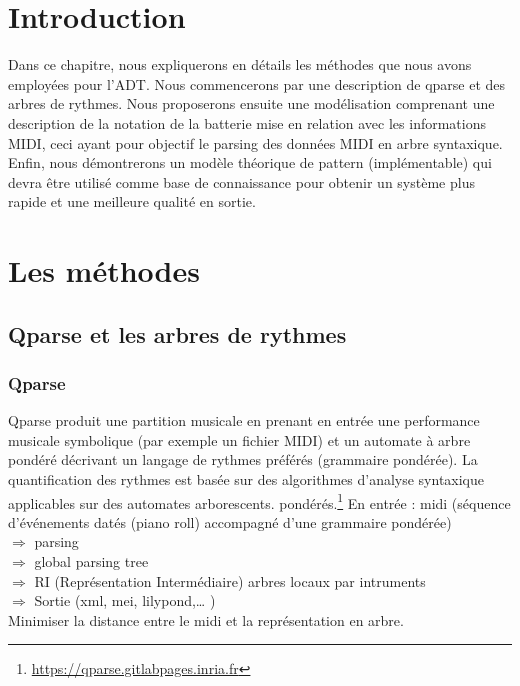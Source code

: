 \section{Introduction}
Dans ce chapitre, nous expliquerons en détails les méthodes que nous avons employées pour l’ADT. Nous commencerons par une description de qparse et des arbres de rythmes. Nous proposerons ensuite une modélisation comprenant une description de la notation de la batterie mise en relation avec les informations MIDI, ceci ayant pour objectif le parsing des données MIDI en arbre syntaxique. Enfin, nous démontrerons un modèle théorique de pattern (implémentable) qui devra être utilisé comme base de connaissance pour obtenir un système plus rapide et une meilleure qualité en sortie.
\section{Les méthodes}
\subsection{Qparse et les arbres de rythmes}
\subsubsection{Qparse}
Qparse produit une partition musicale en prenant en entrée une performance musicale symbolique (par exemple un fichier MIDI) et un automate à arbre pondéré décrivant un langage de rythmes préférés (grammaire pondérée). La quantification des rythmes est basée sur des algorithmes d’analyse syntaxique applicables sur des automates arborescents. pondérés.\footnote{\url{https://qparse.gitlabpages.inria.fr}}
En entrée : midi (séquence d’événements datés (piano roll) accompagné d’une grammaire pondérée)\\
$\Rightarrow$ parsing\\
$\Rightarrow$ global parsing tree\\
$\Rightarrow$ RI (Représentation Intermédiaire) arbres locaux par intruments\\
$\Rightarrow$ Sortie (xml, mei, lilypond,… )\\
Minimiser la distance entre le midi et la représentation en arbre.
